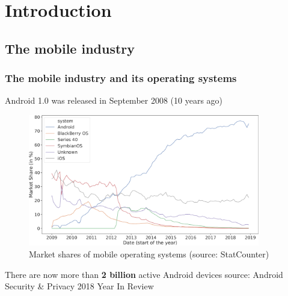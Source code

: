 \section{Introduction}

\subsection[Mobile industry]{The mobile industry}

\begin{frame}
    \frametitle{The mobile industry and its operating systems}
    \centering

    Android 1.0 was released in September 2008 (10 years ago)

    \vspace{-5pt}

    \begin{figure}[!ht]
        \includegraphics[width=0.9\textwidth]{figures/introduction/shares.pdf}
        \caption{\footnotesize{Market shares of mobile operating systems (source: StatCounter)}}
    \end{figure}

    \vspace{-15pt}

    There are now more than \textbf{2 billion} active Android devices
    \smallskip{}
    \scriptsize{}
    source: Android Security \& Privacy 2018 Year In Review


\end{frame}

